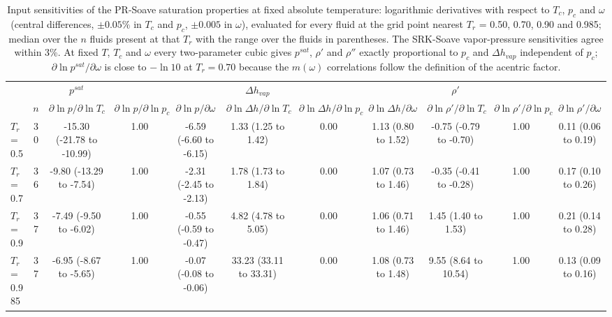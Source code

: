 \begin{table}[H]
\centering
\caption{Input sensitivities of the PR-Soave saturation properties at fixed absolute temperature: logarithmic derivatives with respect to $T_c$, $p_c$ and $\omega$ (central differences, $\pm 0.05\%$ in $T_c$ and $p_c$, $\pm 0.005$ in $\omega$), evaluated for every fluid at the grid point nearest $T_r$ = 0.50, 0.70, 0.90 and 0.985; median over the $n$ fluids present at that $T_r$ with the range over the fluids in parentheses. The SRK-Soave vapor-pressure sensitivities agree within 3\%. At fixed $T$, $T_c$ and $\omega$ every two-parameter cubic gives $p^{sat}$, $\rho'$ and $\rho''$ exactly proportional to $p_c$ and $\Delta h_{vap}$ independent of $p_c$; $\partial \ln p^{sat}/\partial \omega$ is close to $-\ln 10$ at $T_r = 0.70$ because the $m(\omega)$ correlations follow the definition of the acentric factor.}
\label{tab:tabS_sens}
\small
\begin{tabular}{lcccccccccc}
\toprule
 &  & $p^{sat}$ &  &  & $\Delta h_{vap}$ &  &  & $\rho'$ &  &  \\
 & $n$ & $\partial \ln p/\partial \ln T_c$ & $\partial \ln p/\partial \ln p_c$ & $\partial \ln p/\partial \omega$ & $\partial \ln \Delta h/\partial \ln T_c$ & $\partial \ln \Delta h/\partial \ln p_c$ & $\partial \ln \Delta h/\partial \omega$ & $\partial \ln \rho'/\partial \ln T_c$ & $\partial \ln \rho'/\partial \ln p_c$ & $\partial \ln \rho'/\partial \omega$ \\
\midrule
$T_r$ = 0.5 & 30 & -15.30 (-21.78 to -10.99) & 1.00 & -6.59 (-6.60 to -6.15) & 1.33 (1.25 to 1.42) & 0.00 & 1.13 (0.80 to 1.52) & -0.75 (-0.79 to -0.70) & 1.00 & 0.11 (0.06 to 0.19) \\
$T_r$ = 0.7 & 36 & -9.80 (-13.29 to -7.54) & 1.00 & -2.31 (-2.45 to -2.13) & 1.78 (1.73 to 1.84) & 0.00 & 1.07 (0.73 to 1.46) & -0.35 (-0.41 to -0.28) & 1.00 & 0.17 (0.10 to 0.26) \\
$T_r$ = 0.9 & 37 & -7.49 (-9.50 to -6.02) & 1.00 & -0.55 (-0.59 to -0.47) & 4.82 (4.78 to 5.05) & 0.00 & 1.06 (0.71 to 1.46) & 1.45 (1.40 to 1.53) & 1.00 & 0.21 (0.14 to 0.28) \\
$T_r$ = 0.985 & 37 & -6.95 (-8.67 to -5.65) & 1.00 & -0.07 (-0.08 to -0.06) & 33.23 (33.11 to 33.31) & 0.00 & 1.08 (0.73 to 1.48) & 9.55 (8.64 to 10.54) & 1.00 & 0.13 (0.09 to 0.16) \\
\bottomrule
\end{tabular}
\end{table}
